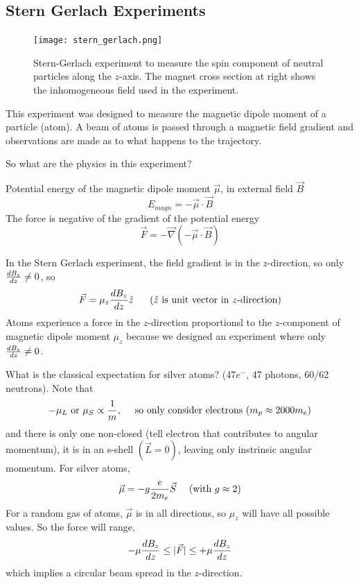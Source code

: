 \documentclass[english, 11pt]{article}
\begin{document}
     \subsection{Stern Gerlach Experiments}

       \begin{figure}[t!]
          \centering
          \texttt{[image: stern\_gerlach.png]}
          \caption{Stern-Gerlach experiment to measure the spin component of neutral particles along the $z$-axis. The magnet cross section at right shows the inhomogeneous field used in the experiment.}
       \end{figure}

       This experiment was designed to measure the magnetic dipole moment of a particle (atom). A beam of atoms is passed through a magnetic field gradient and observations are made as to what happens to the trajectory.
       \newline

       So what are the physics in this experiment?

       Potential energy of the magnetic dipole moment $\vec{\mu}$, in external field $\vec{B}$
       \[ E_{magn} = - \vec{\mu} \cdot \vec{B} \]
       The force is negative of the gradient of the potential energy
       \[ \vec{F} = - \vec{\nabla} ( - \vec{\mu} \cdot \vec{B}) \]

       In the Stern Gerlach experiment, the field gradient is in the $z$-direction, so only $\frac{dB_z}{dz} \not = 0$, so
       \[ \vec{F} = \mu_z \f{dB_z}{dz} \hat{z} \ \ \ \ \ \mbox{($\hat{z}$ is unit vector in $z$-direction)}\]
       Atoms experience a force in the $z$-direction proportionsl to the $z$-component of magnetic dipole moment $\mu_z$ because we designed an experiment where only $\frac{dB_z}{dz} \not = 0$.
       \newline

       What is the classical expectation for silver atoms? (47$e^-$, 47 photons, 60/62 neutrons). Note that
       \[ - \mu_L \mbox{ or } \mu_S \propto \frac{1}{m}, \ \ \ \ \mbox{so only consider electrons } (m_p \approx 2000m_e) \]
       and there is only one non-closed (tell electron that contributes to angular momentum), it is in an s-shell $(\vec{L} = 0)$, leaving only instrinsic angular momentum. For silver atoms,
       \[ \vec{\mu} = - g \f{e}{2m_e} \vec{S} \ \ \ \ \mbox{(with $g \approx 2$)} \]
       For a random gas of atoms, $\vec{\mu}$ is in all directions, so $\mu_z$ will have all possible values. So the force will range,
       \[ - \mu \frac{dB_z}{dz} \leq |\vec{F}| \leq + \mu \frac{dB_z}{dz} \]
       which implies a circular beam spread in the $z$-direction.
       \newline
\end{document}
